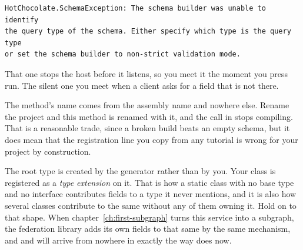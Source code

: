 \begin{verbatim}
HotChocolate.SchemaException: The schema builder was unable to identify
the query type of the schema. Either specify which type is the query type
or set the schema builder to non-strict validation mode.
\end{verbatim}

That one stops the host before it listens, so you meet it the moment you press
run. The silent one you meet when a client asks for a field that is not there.

The method's name comes from the assembly name and nowhere else. Rename the
project and this method is renamed with it, and the call in 
stops compiling. That is a reasonable trade, since a broken build beats an
empty schema, but it does mean that the registration line you copy from any
tutorial is wrong for your project by construction.

%
The root  type is created by the generator rather than by you. Your
class is registered as a \emph{type extension} on it. That is how a static
class with no base type and no interface contributes fields to a type it never
mentions, and it is also how several classes contribute to the same
 without any of them owning it. Hold on to that shape. When
chapter~\ref{ch:first-subgraph} turns this service into a subgraph, the
federation library adds its own fields to that same  by the same
mechanism, and  and  will arrive from nowhere
in exactly the way  does now.
%
